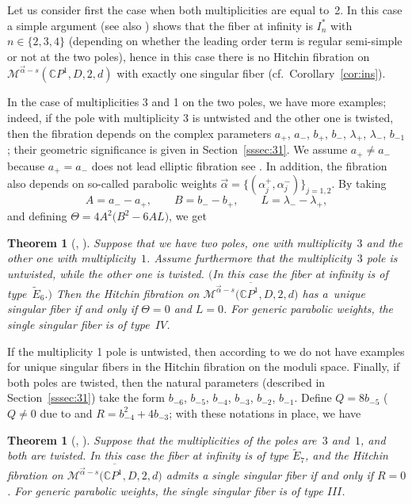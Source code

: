 \documentclass[pdftex]{sigma}
\newcommand{\CP}[1]{\mathbb{C}P^{#1}} %
\newcommand{\Et}[1]{\widetilde{E}_{#1}} %
\newcommand{\Mod}{{\mathcal M}} %
\numberwithin{equation}{section}
\newtheorem{thm}[prop]{Theorem}
\begin{document}
Let us consider first the case when both multiplicities are equal to~2. In this case a simple argument (see also
\cite[Theorems~{2.1,~2.2,~2.3}]{ISS2}) shows that the fiber at infinity
is $I_n^*$ with $n\in \{2,3,4\}$ (depending on whether the leading
order term is regular semi-simple or not at the two poles), hence in
this case there is no Hitchin fibration on $\Mod ^{\vec{\alpha}-s}{(\CP1, D, 2, d)}$ with exactly one
singular fiber (cf.\ Corollary~\ref{cor:ins}).

In the case of multiplicities 3 and 1 on the two poles, we have more
examples; indeed, if the pole with multiplicity 3 is
untwisted and the other one is twisted, then the fibration
depends on the complex parameters
$a_+$, $a_-$, $b_+$, $b_-$, $\lambda_+$, $\lambda_-$, $b_{-1}$;
their geometric significance is given in Section~\ref{sssec:31}.
{We assume $a_+\neq a_-$ because $a_+= a_-$ does not lead elliptic fibration see \cite[Remark~6.7]{ISS2}.}
{In addition, the fibration also depends on so-called parabolic
weights $\vec{\alpha} = \{ (\alpha_j^+, \alpha_j^-) \}_{j=1,2}$.}
By taking
\[
A=a_--a_+,\qquad B=b_--b_+,\qquad L=\lambda_--\lambda_+,
\]
and defining ${\Theta} = 4 A^2 \big(B^2-6 A L\big)$, we get

\begin{thm}[{\cite[Theorem~{2.5}]{ISS2}, \cite[Lemma~2]{Sz_PW}}]\label{thm:TwoPolesUT}
Suppose that we have two poles, one with multiplicity~$3$ and the other
one with multiplicity~$1$. Assume furthermore that the multiplicity~$3$
pole is untwisted, while the other one is twisted. $($In this case the
fiber at infinity is of type~$\Et6.)$ Then the Hitchin fibration
on $\overline{\Mod^{\vec{\alpha}-s} \big(\CP1, D, 2, d\big)}$ has
a~unique singular fiber if and only if ${\Theta} =0$ and $L=0$.
For generic parabolic weights, the single singular fiber is of type~$IV$.
\end{thm}

If the multiplicity 1 pole is untwisted, then according to
\cite[Theorems~{2.4,~2.6}]{ISS2} we do not have examples for unique
singular fibers in the Hitchin fibration on the moduli space.
Finally, if both poles are twisted, then
the natural parameters (described in Section~\ref{sssec:31})
take the form
$b_{-6}$, $b_{-5}$, $b_{-4}$, $b_{-3}$, $b_{-2}$, $b_{-1}$.
Define $Q=8b_{-5}$ ({$Q\neq 0$ due to \cite[Lemma~6.8]{ISS2}} and $R=b_{-4}^2+4 b_{-3}$;
with these notations in place, we have
\begin{thm}[{\cite[Theorem~{2.7}]{ISS2}, \cite[Lemma~2]{Sz_PW}}]\label{thm:TwoPolesTT}
Suppose that the multiplicities of the poles are~$3$ and~$1$, and both
are twisted. In this case the fiber at infinity is of type
$\Et7$, and the Hitchin fibration on $\overline{\Mod^{\vec{\alpha}-s} \big(\CP1, D, 2, d\big)}$
admits a single singular fiber if and only if $R=0$.
{For generic parabolic weights}, the single singular fiber is of type $III$.
\end{thm}
\end{document}
